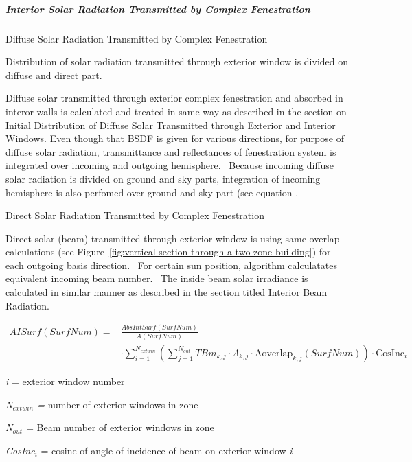 \subparagraph{Interior Solar Radiation Transmitted by Complex Fenestration}\label{interior-solar-radiation-transmitted-by-complex-fenestration}

Diffuse Solar Radiation Transmitted by Complex Fenestration

Distribution of solar radiation transmitted through exterior window is divided on diffuse and direct part.

Diffuse solar transmitted through exterior complex fenestration and absorbed in interor walls is calculated and treated in same way as described in the section on Initial Distribution of Diffuse Solar Transmitted through Exterior and Interior Windows. Even though that BSDF is given for various directions, for purpose of diffuse solar radiation, transmittance and reflectances of fenestration system is integrated over incoming and outgoing hemisphere.~ Because incoming diffuse solar radiation is divided on ground and sky parts, integration of incoming hemisphere is also perfomed over ground and sky part (see equation .

Direct Solar Radiation Transmitted by Complex Fenestration

Direct solar (beam) transmitted through exterior window is using same overlap calculations (see Figure~\ref{fig:vertical-section-through-a-two-zone-building}) for each outgoing basis direction.~ For certain sun position, algorithm calculatates equivalent incoming beam number.~ The inside beam solar irradiance is calculated in similar manner as described in the section titled Interior Beam Radiation.

\begin{equation}
\begin{split}
AISurf\left(SurfNum\right) =& \frac{AbsIntSurf\left(SurfNum\right)}{A\left(SurfNum\right)} \\
&\cdot\sum_{i = 1}^{N_{extwin}} \left( \sum_{j = 1}^{N_{out}} TB{m_{k,j}} \cdot \Lambda_{k,j} \cdot \text{Aoverlap}_{k,j} \left( SurfNum \right)\right) \cdot \text{CosInc}_i
\end{split}
\end{equation}

\emph{i} = exterior window number

\emph{N\(_{extwin}\) =} number of exterior windows in zone

\emph{N\(_{out}\) =} Beam number of exterior windows in zone

\emph{CosInc\(_{i}\)} = cosine of angle of incidence of beam on exterior window \emph{i}

